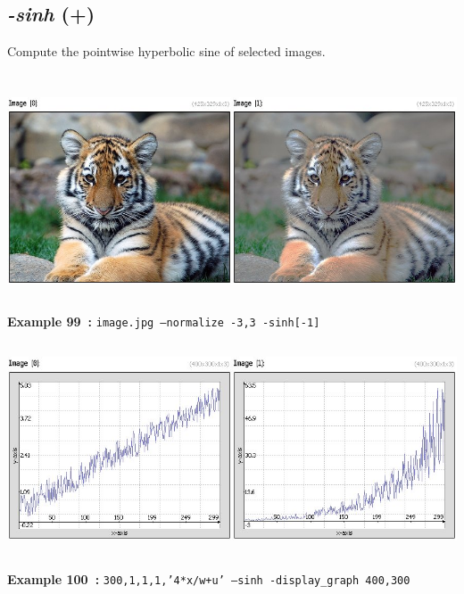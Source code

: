 \documentclass[a4paper,11pt,twoside]{book}
\begin{document}
\subsection{\emph{-sinh} (+)}\vspace*{-0.5em}
Compute the pointwise hyperbolic sine of selected images.
\begin{center}\includegraphics[keepaspectratio=true,height=7cm,width=\textwidth]{img/gmic_def99.jpg}\\
{\footnotesize \textbf{Example 99~:} \texttt{image.jpg --normalize -3,3 -sinh[-1]}}
\\\includegraphics[keepaspectratio=true,height=7cm,width=\textwidth]{img/gmic_def100.jpg}\\
{\footnotesize \textbf{Example 100~:} \texttt{300,1,1,1,'4*x/w+u' --sinh -display\_graph 400,300}}
\end{center}
\end{document}
